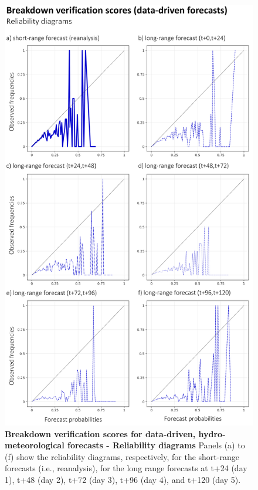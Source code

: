 \begin{figure}[htbp]
\centering
\includegraphics[width=\textwidth]{hydro_based_ff_verif_breakdown_scores_rel_diag.png}
\caption{\textbf{Breakdown verification scores for data-driven, hydro-meteorological forecasts - Reliability diagrams} Panels (a) to (f) show the reliability diagrams, respectively, for the short-range forecasts (i.e., reanalysis), for the long range forecasts at t+24 (day 1), t+48 (day 2), t+72 (day 3), t+96 (day 4), and t+120 (day 5).}
\label{fig:hydro_based_ff_verif_breakdown_scores_rel_diag}
\end{figure}


